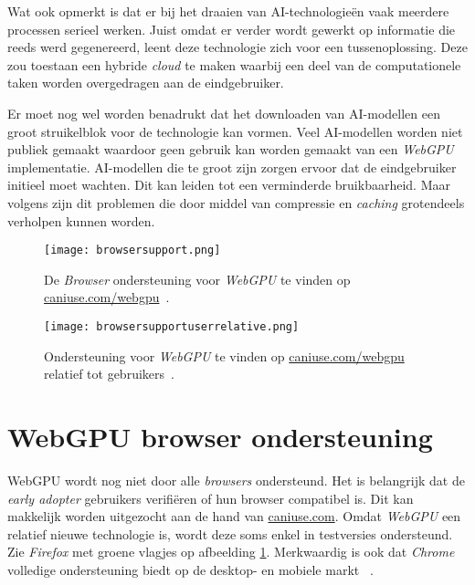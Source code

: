 \bigbreak{}

Wat \textcite{Fleetwood2022} ook opmerkt is dat er bij het draaien van  AI-technologieën vaak meerdere processen serieel werken. Juist omdat er verder wordt gewerkt op informatie die reeds werd gegenereerd, leent deze technologie zich voor een tussenoplossing. Deze zou toestaan een hybride \textit{cloud} te maken waarbij een deel van de computationele taken worden overgedragen aan de eindgebruiker.

\bigbreak{}

Er moet nog wel worden benadrukt dat het downloaden van AI-modellen een groot struikelblok voor de technologie kan vormen. Veel AI-modellen worden niet publiek gemaakt waardoor geen gebruik kan worden gemaakt van een \textit{WebGPU} implementatie. AI-modellen die te groot zijn zorgen ervoor dat de eindgebruiker initieel moet wachten. Dit kan leiden tot een verminderde bruikbaarheid. Maar volgens \textcite{Fleetwood2022} zijn dit problemen die door middel van compressie en \textit{caching} grotendeels verholpen kunnen worden.

\break{}

\begin{figure}
    \texttt{[image: browsersupport.png]}
    \caption[Ondersteuning voor \textit{WebGPU}~\autocite{Deveria2024}]{
        De \textit{Browser} ondersteuning voor \textit{WebGPU} te vinden op \href{https://caniuse.com/webgpu}{caniuse.com/webgpu}~\autocite{Deveria2024}.
    }
    \label{fig:Browser Support}
\end{figure}

\begin{figure}
    \texttt{[image: browsersupportuserrelative.png]}
    \caption[Eindgebruikers met toegang tot \textit{WebGPU}~\autocite{Deveria2024}]{
        Ondersteuning voor \textit{WebGPU} te vinden op \href{https://caniuse.com/webgpu}{caniuse.com/webgpu} relatief tot gebruikers~\autocite{Deveria2024}.
    }
    \label{fig:Relative Browser Support}
\end{figure}

\section{WebGPU browser ondersteuning}

WebGPU wordt nog niet door alle \textit{browsers} ondersteund. Het is belangrijk dat de \textit{early adopter} gebruikers verifiëren of hun browser compatibel is. Dit kan makkelijk worden uitgezocht aan de hand van \href{https://caniuse.com/webgpu}{caniuse.com}. Omdat \textit{WebGPU} een relatief nieuwe technologie is, wordt deze soms enkel in testversies ondersteund. Zie \textit{Firefox} met groene vlagjes op afbeelding \ref{fig:Browser Support}. Merkwaardig is ook dat \textit{Chrome} volledige ondersteuning biedt op de desktop- en mobiele markt ~\autocite{Deveria2024}.

